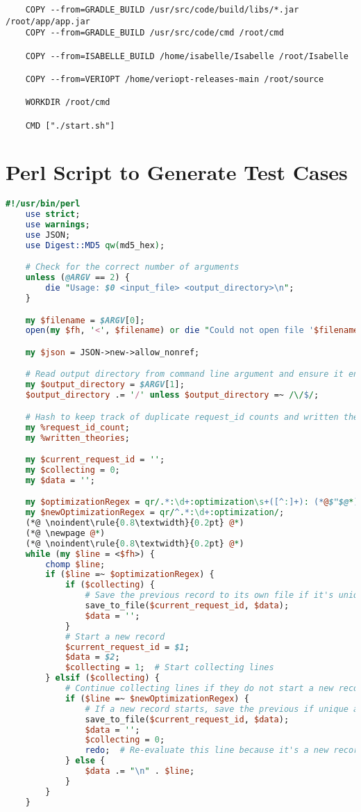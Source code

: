 \begin{appendices}
\begin{lstlisting}
    COPY --from=GRADLE_BUILD /usr/src/code/build/libs/*.jar /root/app/app.jar
    COPY --from=GRADLE_BUILD /usr/src/code/cmd /root/cmd

    COPY --from=ISABELLE_BUILD /home/isabelle/Isabelle /root/Isabelle

    COPY --from=VERIOPT /home/veriopt-releases-main /root/source

    WORKDIR /root/cmd

    CMD ["./start.sh"]
\end{lstlisting}

\chapter{Perl Script to Generate Test Cases}
\label{app:supportTool}

\begin{lstlisting}[language=perl]
    #!/usr/bin/perl
    use strict;
    use warnings;
    use JSON;
    use Digest::MD5 qw(md5_hex);

    # Check for the correct number of arguments
    unless (@ARGV == 2) {
        die "Usage: $0 <input_file> <output_directory>\n";
    }

    my $filename = $ARGV[0];
    open(my $fh, '<', $filename) or die "Could not open file '$filename' $!";

    my $json = JSON->new->allow_nonref;

    # Read output directory from command line argument and ensure it ends with a slash
    my $output_directory = $ARGV[1];
    $output_directory .= '/' unless $output_directory =~ /\/$/;

    # Hash to keep track of duplicate request_id counts and written theories
    my %request_id_count;
    my %written_theories;

    my $current_request_id = '';
    my $collecting = 0;
    my $data = '';

    my $optimizationRegex = qr/.*:\d+:optimization\s+([^:]+): (*@$"$@*)(.*)$/;
    my $newOptimizationRegex = qr/^.*:\d+:optimization/;
    (*@ \noindent\rule{0.8\textwidth}{0.2pt} @*)
    (*@ \newpage @*)
    (*@ \noindent\rule{0.8\textwidth}{0.2pt} @*)
    while (my $line = <$fh>) {
        chomp $line;
        if ($line =~ $optimizationRegex) {
            if ($collecting) {
                # Save the previous record to its own file if it's unique
                save_to_file($current_request_id, $data);
                $data = '';
            }
            # Start a new record
            $current_request_id = $1;
            $data = $2;
            $collecting = 1;  # Start collecting lines
        } elsif ($collecting) {
            # Continue collecting lines if they do not start a new record
            if ($line =~ $newOptimizationRegex) {
                # If a new record starts, save the previous if unique and reset
                save_to_file($current_request_id, $data);
                $data = '';
                $collecting = 0;
                redo;  # Re-evaluate this line because it's a new record start
            } else {
                $data .= "\n" . $line;
            }
        }
    }


\end{lstlisting}
\end{appendices}
